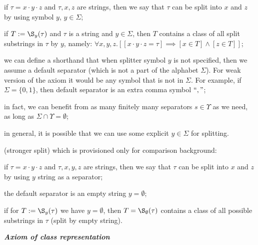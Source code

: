 \begin{definition}
\begin{legal}
\begin{legal}
\begin{legal}
        \item if $\tau = x \cdot y \cdot z$ and $\tau, x, z$ are strings, then we say that $\tau$ can be split into $x$ and $z$ by using symbol $y$, $y \in \Sigma$;
        \item if $T := \S_{y}(\tau)$ and $\tau$ is a string and $y \in \Sigma$, then $T$ contains a class of all split substrings in $\tau$ by $y$, namely: $\forall x,y,z . [[x \cdot y \cdot z = \tau] \implies [x \in T] \land [z \in T]]$;
        \item we can define a shorthand that when splitter symbol $y$ is not specified, then we assume a default separator (which is not a part of the alphabet $\Sigma$). For weak version of the axiom it would be any symbol that is not in $\Sigma$. For example, if $\Sigma = \{0,1\}$, then default separator is an extra comma symbol $\text{``} , \text{''}$;
        \item in fact, we can benefit from as many finitely many separators $s \in \Upsilon$ as we need, as long as $\Sigma \cap \Upsilon = \emptyset$;
        \item in general, it is possible that we can use some explicit $y \in \Sigma$ for splitting.
      \end{legal}
      \item (stronger split) which is provisioned only for comparison background:
      \begin{legal}
        \item if $\tau = x \cdot y \cdot z$ and $\tau, x, y, z$ are strings, then we say that $\tau$ can be split into $x$ and $z$ by using $y$ string as a separator;
        \item the default separator is an empty string $y = \emptyset$;
        \item if for $T := \S_{y}(\tau)$ we have $y = \emptyset$, then $T = \S_{\emptyset}(\tau)$ contains a class of all possible substrings in $\tau$ (split by empty string).
      \end{legal}
    \end{legal}
    \item \textbf{\textit{Axiom of class representation}} 
    \begin{legal}

\end{legal}
\end{legal}
\end{definition}
